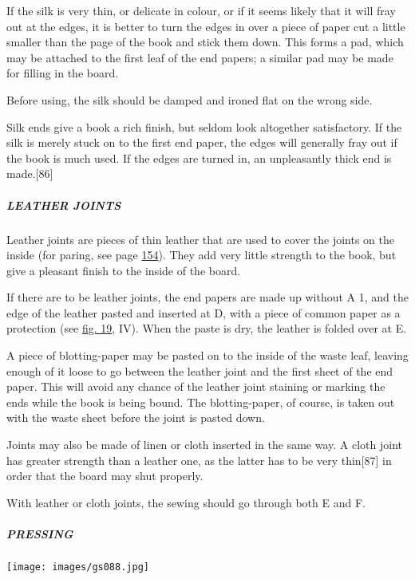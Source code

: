 \documentclass[
]{article}
\begin{document}
If the silk is very thin, or delicate in colour, or if it seems likely
that it will fray out at the edges, it is better to turn the edges in
over a piece of paper cut a little smaller than the page of the book and
stick them down. This forms a pad, which may be attached to the first
leaf of the end papers; a similar pad may be made for filling in the
board.

Before using, the silk should be damped and ironed flat on the wrong
side.

Silk ends give a book a rich finish, but seldom look altogether
satisfactory. If the silk is merely stuck on to the first end paper, the
edges will generally fray out if the book is much used. If the edges are
turned in, an unpleasantly thick end is
made.{\protect\hypertarget{Page_86}{}{{[}86{]}}}

\hypertarget{leather-joints}{%
\subparagraph{LEATHER JOINTS}\label{leather-joints}}

Leather joints are pieces of thin leather that are used to cover the
joints on the inside (for paring, see page
\protect\hyperlink{Page_154}{154}). They add very little strength to the
book, but give a pleasant finish to the inside of the board.

If there are to be leather joints, the end papers are made up without A
1, and the edge of the leather pasted and inserted at D, with a piece of
common paper as a protection (see \protect\hyperlink{Fig_19}{fig. 19},
IV). When the paste is dry, the leather is folded over at E.

A piece of blotting-paper may be pasted on to the inside of the waste
leaf, leaving enough of it loose to go between the leather joint and the
first sheet of the end paper. This will avoid any chance of the leather
joint staining or marking the ends while the book is being bound. The
blotting-paper, of course, is taken out with the waste sheet before the
joint is pasted down.

Joints may also be made of linen or cloth inserted in the same way. A
cloth joint has greater strength than a leather one, as the latter has
to be very thin{\protect\hypertarget{Page_87}{}{{[}87{]}}} in order that
the board may shut properly.

With leather or cloth joints, the sewing should go through both E and F.

\hypertarget{pressing}{%
\subparagraph{PRESSING}\label{pressing}}

\protect\hypertarget{Fig_20}{}{}
\texttt{[image: images/gs088.jpg]}
\end{document}
